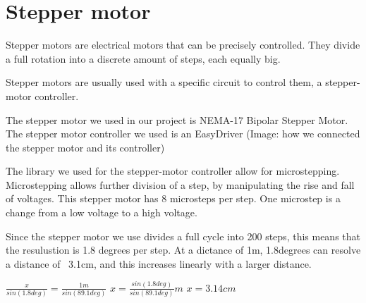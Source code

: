 \clearpage
\section{Stepper motor}
Stepper motors are electrical motors that can be precisely controlled. They divide a full rotation into a discrete amount of steps, each equally big.

Stepper motors are usually used with a specific circuit to control them, a stepper-motor controller.

The stepper motor we used in our project is NEMA-17 Bipolar Stepper Motor.
\cite{steppermotor}
The stepper motor controller we used is an EasyDriver
\cite{steppercontroller}
(Image: how we connected the stepper motor and its controller)


The library we used for the stepper-motor controller allow for microstepping. Microstepping allows further division of a step, by manipulating the rise and fall of voltages.
This stepper motor has 8 microsteps per step. One microstep is a change from a low voltage to a high voltage.

%

Since the stepper motor we use divides a full cycle into 200 steps, this means that the resulustion is 1.8 degrees per step. At a dictance of 1m, 1.8degrees can resolve a distance of ~3.1cm, and this increases linearly with a larger distance.

$\frac{x}{sin(1.8deg)} = \frac{1m}{sin(89.1deg)}$
$x = \frac{sin(1.8deg)}{sin(89.1deg)}m$
$x = 3.14cm$
